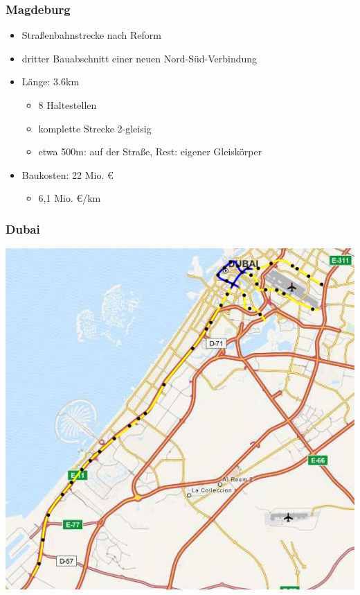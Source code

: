\documentclass[xcolor=dvipsnames]{beamer}
\begin{document}

\begin{frame}
  \frametitle{Magdeburg}

  \begin{itemize}
  \item Straßenbahnstrecke nach Reform
  \item dritter Bauabschnitt einer neuen Nord-Süd-Verbindung
  \item Länge: 3.6km
    \begin{itemize}
    \item 8 Haltestellen
    \item komplette Strecke 2-gleisig
    \item etwa 500m: auf der Straße, Rest: eigener Gleiskörper
    \end{itemize}
  \item Baukosten: 22 Mio. €
    \begin{itemize}
    \item 6,1 Mio. €/km
    \end{itemize}
  \end{itemize}
\end{frame}


\begin{frame}
  \frametitle{Dubai}

  \begin{center}
    \includegraphics[height=.8\textheight]{data/Dubai.png}
  \end{center}
\end{frame}
\end{document}
